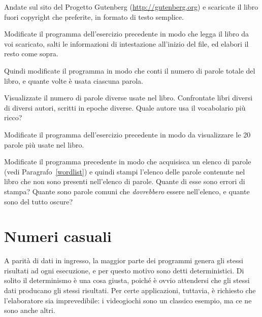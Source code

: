 \documentclass[10pt]{book}
\begin{document}
\vspace{0.2in}
\begin{exercise}

Andate sul sito del Progetto Gutenberg (\url{http://gutenberg.org}) e scaricate il libro fuori copyright che preferite, in formato di testo semplice.

Modificate il programma dell'esercizio precedente in modo che legga il libro da voi scaricato, salti le informazioni di intestazione all'inizio del file, ed elabori il resto come sopra.

Quindi modificate il programma in modo che conti il numero di parole totale del libro, e quante volte è usata ciascuna parola.

Visualizzate il numero di parole diverse usate nel libro. Confrontate libri diversi di diversi autori, scritti in epoche diverse. Quale autore usa il vocabolario più ricco?
\end{exercise}

\vspace{0.2in}
\begin{exercise}

Modificate il programma dell'esercizio precedente in modo da visualizzare le 20 parole più usate nel libro.

\end{exercise}

\vspace{0.2in}
\begin{exercise}

Modificate il programma precedente in modo che acquisisca un elenco di parole (vedi Paragrafo~\ref{wordlist}) e quindi stampi l'elenco delle parole contenute nel libro che non sono presenti nell'elenco di parole. Quante di esse sono errori di stampa? Quante sono parole comuni che {\em dovrebbero} essere nell'elenco, e quante sono del tutto oscure?

\end{exercise}


\section{Numeri casuali}

A parità di dati in ingresso, la maggior parte dei programmi genera gli stessi risultati ad ogni esecuzione, e per questo motivo sono detti deterministici. Di solito il determinismo è una cosa giusta, poiché è ovvio attendersi che gli stessi dati producano gli stessi risultati. Per certe applicazioni, tuttavia, è richiesto che l'elaboratore sia imprevedibile: i videogiochi sono un classico esempio, ma ce ne sono anche altri.
\end{document}
